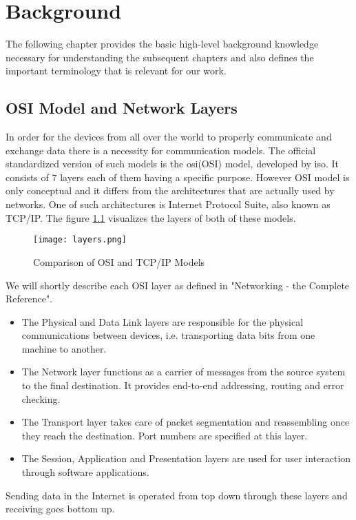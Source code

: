 \chapter{Background}
The following chapter provides the basic high-level background knowledge necessary for understanding the subsequent chapters and also defines the important terminology that is relevant for our work.

\section{OSI Model and Network Layers}
In order for the devices from all over the world to properly communicate and exchange data there is a necessity for communication models. The official standardized version of such models is the \acl{osi}(OSI) model, developed by \acl{iso}\cite{osi_iso}. It consists of 7 layers each of them having a specific purpose. However OSI model is only conceptual and it differs from the architectures that are actually used by networks. One of such architectures is Internet Protocol Suite, also known as TCP/IP. The figure \ref{osi_tcp_ip} visualizes the layers of both of these models.

\begin{figure}[H]
 \centering
 \texttt{[image: layers.png]}
 \caption{Comparison of OSI and TCP/IP Models}
 \label{osi_tcp_ip}
\end{figure}

We will shortly describe each OSI layer as defined in "Networking - the Complete Reference"\cite{osi_model_ref}.
\begin{itemize}
	\item The Physical and Data Link layers are responsible for the physical communications between devices, i.e. transporting data bits from one machine to another. 
	\item The Network layer functions as a carrier of messages from the source system to the final destination. It provides end-to-end addressing, routing and error checking.
	\item The Transport layer takes care of packet segmentation and reassembling once they reach the destination. Port numbers are specified at this layer. 
	\item The Session, Application and Presentation layers are used for user interaction through software applications.
\end{itemize}

Sending data in the Internet is operated from top down through these layers and receiving goes bottom up.

